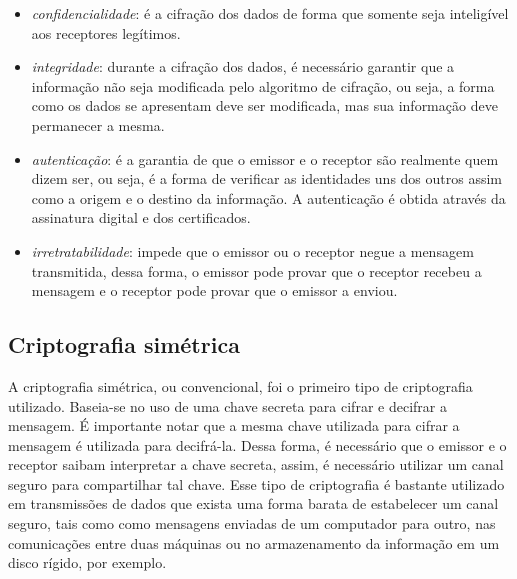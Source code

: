 \begin{itemize}
\item \textit{confidencialidade}: é a cifração dos dados de forma que somente seja inteligível aos receptores legítimos.
\item \textit{integridade}: durante a cifração dos dados, é necessário garantir que a informação não seja modificada pelo algoritmo de cifração, ou seja, a forma como os dados se apresentam deve ser modificada, mas sua informação deve permanecer a mesma.
\item \textit{autenticação}: é a garantia de que o emissor e o receptor são realmente quem dizem ser, ou seja, é a forma de verificar as identidades uns dos outros assim como a origem e o destino da informação. A autenticação é obtida através da assinatura digital e dos certificados.
\item \textit{irretratabilidade}: impede que o emissor ou o receptor negue a mensagem transmitida, dessa forma, o emissor pode provar que o receptor recebeu a mensagem e o receptor pode provar que o emissor a enviou.
\end{itemize}

%
%
\subsection{Criptografia simétrica}
A criptografia simétrica, ou convencional, foi o primeiro tipo de criptografia utilizado. Baseia-se no uso de uma chave secreta para cifrar e decifrar a mensagem. É importante notar que a mesma chave utilizada para cifrar a mensagem é utilizada para decifrá-la. Dessa forma, é necessário que o emissor e o receptor saibam interpretar a chave secreta, assim, é necessário utilizar um canal seguro para compartilhar tal chave. Esse tipo de criptografia é bastante utilizado em transmissões de dados que exista uma forma barata de estabelecer um canal seguro, tais como como mensagens enviadas de um computador para outro, nas comunicações entre duas máquinas ou no armazenamento da informação em um disco rígido, por exemplo. \cite{Cavalcante:2015}

%
%
